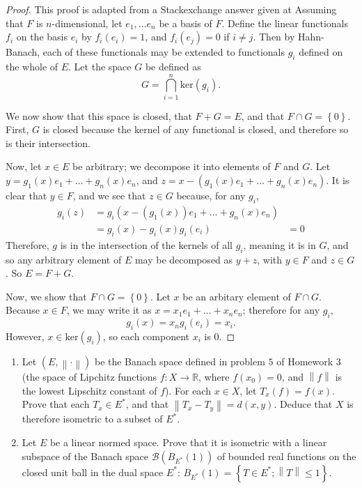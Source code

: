 \documentclass[12pt]{article}
\newcommand{\R}{\mathbb{R}}
\theoremstyle{definition}
\newenvironment{problem}[2][Problem]{\begin{trivlist}
\item[\hskip \labelsep {\bfseries #1}\hskip \labelsep {\bfseries #2.}]}{\end{trivlist}}
\begin{document}
\begin{proof}
This proof is adapted from a Stackexchange answer given at \cite{se} Assuming that $F$ is $n$-dimensional, let $e_1, ... e_n$ be a basis of $F$. Define the linear functionals $f_i$ on the basis $e_i$ by $f_i(e_i) = 1$, and $f_i(e_j) = 0$ if $i \neq j$. Then by Hahn-Banach, each of these functionals may be extended to functionals $g_i$ defined on the whole of $E$. Let the space $G$ be defined as
\[ G = \bigcap_{i = 1}^n \text{ker}(g_i).\]
\par We now show that this space is closed, that $F+G=E$, and that $F \cap G = \left\{ 0 \right\}$. First, $G$ is closed because the kernel of any functional is closed, and therefore so is their intersection.
\par Now, let $x \in E$ be arbitrary; we decompose it into elements of $F$ and $G$. Let $y = g_1(x)e_1 + \dots + g_n(x)e_n$, and $z = x - (g_1(x)e_1 + \dots + g_n(x)e_n)$. It is clear that $y \in F$, and we see that $z \in G$ because, for any $g_i$, 
\begin{align*}g_i(z) & = g_i(x - (g_1(x))e_1 + \dots + g_n(x)e_n)\\
&= g_i(x) - g_i(x)g_i(e_i)
&= 0\end{align*}
Therefore, $g$ is in the intersection of the kernels of all $g_i$, meaning it is in $G$, and so any arbitrary element of $E$ may be decomposed as $y+z$, with $y \in F$ and $z \in G$. So $E = F + G$.
\par Now, we show that $F \cap G = \left\{ 0 \right\}$. Let $x$ be an arbitary element of $F \cap G$. Because $x \in F$, we may write it as $x = x_1 e_1 + \dots + x_n e_n$; therefore for any $g_i$,
\[g_i(x) = x_ng_i(e_i) = x_i.\] However, $x \in \text{ker}(g_i)$, so each component $x_i$ is  $0$.
\end{proof}
\begin{problem}{3}
	\begin{enumerate}[label=(\roman*)]
		\item Let $(E, \left \lVert { \cdot } \right \lVert )$ be the Banach space defined in problem $5$ of Homework 3 (the space of Lipchitz functions $f: X \to \R$, where $f(x_0) = 0$, and $\left \lVert { f } \right \lVert $ is the lowest Lipschitz constant of $f$). For each $x \in X$, let $T_x(f) = f(x)$. Prove that each $T_x \in E^*$, and that $\left \lVert { T_x - T_y } \right \lVert = d(x,y)$. Deduce that $X$ is therefore isometric to a subset of $E^*$.
		\item Let $E$ be a linear normed space. Prove that it is isometric with a linear subspace of the Banach space $\mathcal B(B_{E^*}(1))$ of bounded real functions on the closed unit ball in the dual space $E^{*}$: $B_{E^*}(1) = \left\{ T \in E^{*}; \left \lVert { T } \right \lVert \leq 1 \right\}$.
	\end{enumerate}
\end{problem}
\end{document}
